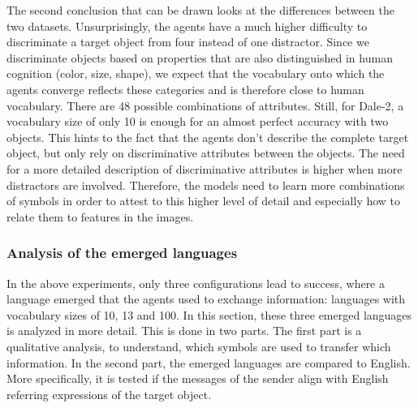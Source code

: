 The second conclusion that can be drawn looks at the differences between the two datasets.
Unsurprisingly, the agents have a much higher difficulty to discriminate a target object from four instead of one distractor.
Since we discriminate objects based on properties that are also distinguished in human cognition (color, size, shape), we expect that the vocabulary onto which the agents converge reflects these categories and is therefore close to human vocabulary.
There are 48 possible combinations of attributes.
Still, for Dale-2, a vocabulary size of only 10 is enough for an almost perfect accuracy with two objects.
This hints to the fact that the agents don't describe the complete target object, but only rely on discriminative attributes between the objects.
The need for a more detailed description of discriminative attributes is higher when more distractors are involved.
Therefore, the models need to learn more combinations of symbols in order to attest to this higher level of detail and especially how to relate them to features in the images.


\subsubsection*{Analysis of the emerged languages}
In the above experiments, only three configurations lead to success, where a language emerged that the agents used to exchange information: languages with vocabulary sizes of 10, 13 and 100.
In this section, these three emerged languages is analyzed in more detail.
This is done in two parts.
The first part is a qualitative analysis, to understand, which symbols are used to transfer which information.
In the second part, the emerged languages are compared to English.
More specifically, it is tested if the messages of the sender align with English referring expressions of the target object.


